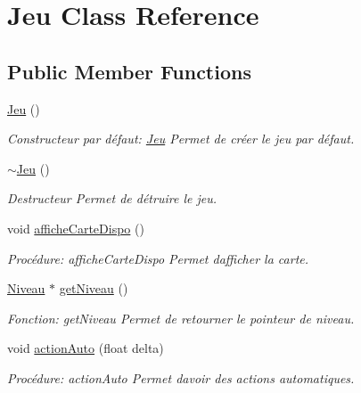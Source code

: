 \hypertarget{classJeu}{}\section{Jeu Class Reference}
\label{classJeu}
\subsection*{Public Member Functions}
\begin{DoxyCompactItemize}
\item 
\hyperlink{classJeu_acc5795ee00edf75516d3dfe65be3e6d6}{Jeu} ()
\begin{DoxyCompactList}\small\item\em Constructeur par défaut\+: \hyperlink{classJeu}{Jeu} Permet de créer le jeu par défaut. \end{DoxyCompactList}\item 
\mbox{\label{classJeu_a9cd19e73df169d7f09397be61ba8548c}} 
\hyperlink{classJeu_a9cd19e73df169d7f09397be61ba8548c}{$\sim$\+Jeu} ()
\begin{DoxyCompactList}\small\item\em Destructeur Permet de détruire le jeu. \end{DoxyCompactList}\item 
void \hyperlink{classJeu_a4f8c73b225819fb5a6ba342adc2f1fa4}{affiche\+Carte\+Dispo} ()
\begin{DoxyCompactList}\small\item\em Procédure\+: affiche\+Carte\+Dispo Permet d\textquotesingle{}afficher la carte. \end{DoxyCompactList}\item 
\hyperlink{classNiveau}{Niveau} $\ast$ \hyperlink{classJeu_a71bf0b5329ade330d95318b50d1e2f12}{get\+Niveau} ()
\begin{DoxyCompactList}\small\item\em Fonction\+: get\+Niveau Permet de retourner le pointeur de niveau. \end{DoxyCompactList}\item 
void \hyperlink{classJeu_a8d2a0773d8edcb42d5e055785ad4b71a}{action\+Auto} (float delta)
\begin{DoxyCompactList}\small\item\em Procédure\+: action\+Auto Permet d\textquotesingle{}avoir des actions automatiques. \end{DoxyCompactList}\end{DoxyCompactItemize}


